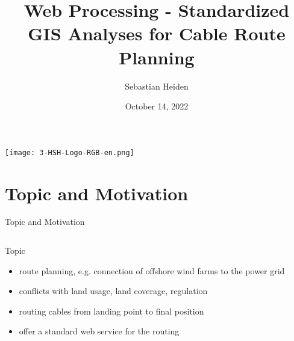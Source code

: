 \documentclass[usenames,dvipsnames,aspectratio=169]{beamer}
\title{Web Processing - Standardized GIS Analyses for Cable Route Planning}
\author{Sebastian Heiden}
\institute{Harz University of Applied Sciences}
\date{October 14, 2022}
\begin{document}
    

\begin{frame}[plain]
	\texttt{[image: 3-HSH-Logo-RGB-en.png]}
    \maketitle
\end{frame}

\section{Topic and Motivation}
\begin{frame}{Topic and Motivation}
\begin{columns}[T] %
\begin{column}{.68\textwidth}
	Topic
	\begin{itemize}
		\item route planning, e.g. connection of offshore wind farms to the power grid
		\item conflicts with land usage, land coverage, regulation
		\item routing cables from landing point to final position
		\item offer a standard web service for the routing


\end{itemize}
\end{column}
\end{columns}
\end{frame}
\end{document}
